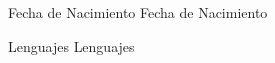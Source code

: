 
\begin{cvskills}
  \cvskill
    {Fecha de Nacimiento} %
    {Fecha de Nacimiento} %

  \cvskill
    {Lenguajes} %
    {Lenguajes} %

\end{cvskills}